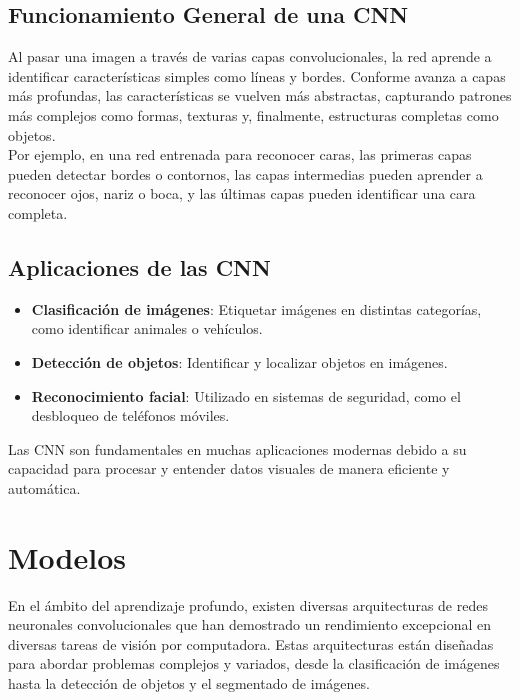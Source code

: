 \subsection{Funcionamiento General de una CNN}\label{subsec:funcionamiento-general-de-una-cnn}
Al pasar una imagen a través de varias capas convolucionales, la red aprende a identificar características simples como
líneas y bordes.
Conforme avanza a capas más profundas, las características se vuelven más abstractas, capturando patrones más complejos
como formas, texturas y, finalmente, estructuras completas como objetos. \\[6pt]

Por ejemplo, en una red entrenada para reconocer caras, las primeras capas pueden detectar bordes o contornos, las
capas intermedias pueden aprender a reconocer ojos, nariz o boca, y las últimas capas pueden identificar una cara
completa.

\subsection{Aplicaciones de las CNN}\label{subsec:aplicaciones-de-las-cnn}
\begin{itemize}
    \item \textbf{Clasificación de imágenes}: Etiquetar imágenes en distintas categorías, como identificar animales o
vehículos.
    \item \textbf{Detección de objetos}: Identificar y localizar objetos en imágenes.
    \item \textbf{Reconocimiento facial}: Utilizado en sistemas de seguridad, como el desbloqueo de teléfonos móviles.
\end{itemize}

Las CNN son fundamentales en muchas aplicaciones modernas debido a su capacidad para procesar y entender datos visuales
de manera eficiente y automática.

\section{Modelos}\label{sec:modelos}
En el ámbito del aprendizaje profundo, existen diversas arquitecturas de redes neuronales convolucionales que han
demostrado un rendimiento excepcional en diversas tareas de visión por computadora.
Estas arquitecturas están diseñadas para abordar problemas complejos y variados, desde la clasificación de imágenes
hasta la detección de objetos y el segmentado de imágenes. \\[6pt]

